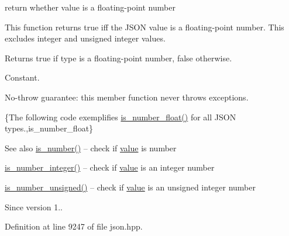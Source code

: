 return whether value is a floating-\/point number 

This function returns true iff the J\+S\+ON value is a floating-\/point number. This excludes integer and unsigned integer values.

\begin{DoxyReturn}{Returns}
{\ttfamily true} if type is a floating-\/point number, {\ttfamily false} otherwise.
\end{DoxyReturn}
Constant.

No-\/throw guarantee\+: this member function never throws exceptions.

\{The following code exemplifies {\ttfamily \hyperlink{classnlohmann_1_1basic__json_a33b4bf898b857c962e798fc7f6e86e70}{is\+\_\+number\+\_\+float()}} for all J\+S\+ON types.,is\+\_\+number\+\_\+float\}

\begin{DoxySeeAlso}{See also}
\hyperlink{classnlohmann_1_1basic__json_a2b9852390abb4b1ef5fac6984e2fc0f3}{is\+\_\+number()} -- check if \hyperlink{classnlohmann_1_1basic__json_a9fa223b26419f018f9b18cc516e3a8e5}{value} is number 

\hyperlink{classnlohmann_1_1basic__json_abac8af76067f1e8fdca9052882c74428}{is\+\_\+number\+\_\+integer()} -- check if \hyperlink{classnlohmann_1_1basic__json_a9fa223b26419f018f9b18cc516e3a8e5}{value} is an integer number 

\hyperlink{classnlohmann_1_1basic__json_abc7378cba0613a78b9aad1c8e7044bb0}{is\+\_\+number\+\_\+unsigned()} -- check if \hyperlink{classnlohmann_1_1basic__json_a9fa223b26419f018f9b18cc516e3a8e5}{value} is an unsigned integer number
\end{DoxySeeAlso}
\begin{DoxySince}{Since}
version 1.. 
\end{DoxySince}


Definition at line 9247 of file json.\+hpp.

